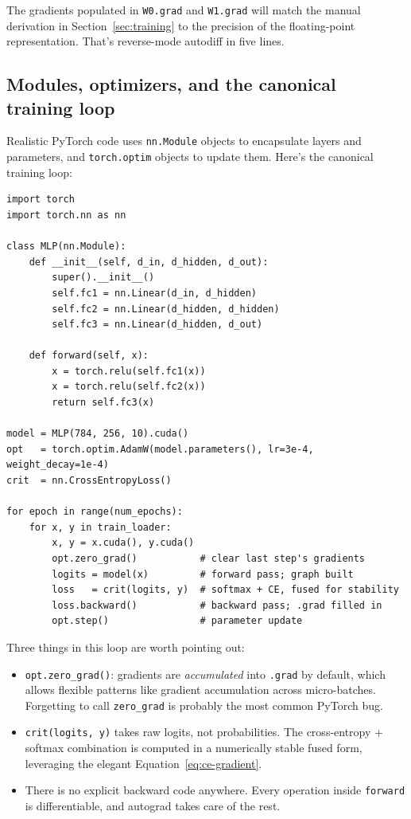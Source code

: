 \documentclass[11pt, a4paper]{article}
\begin{document}
The gradients populated in \verb|W0.grad| and \verb|W1.grad| will match the manual derivation in Section~\ref{sec:training} to the precision of the floating-point representation. That's reverse-mode autodiff in five lines.

\subsection{Modules, optimizers, and the canonical training loop}

Realistic PyTorch code uses \verb|nn.Module| objects to encapsulate layers and parameters, and \verb|torch.optim| objects to update them. Here's the canonical training loop:

\begin{lstlisting}
import torch
import torch.nn as nn

class MLP(nn.Module):
    def __init__(self, d_in, d_hidden, d_out):
        super().__init__()
        self.fc1 = nn.Linear(d_in, d_hidden)
        self.fc2 = nn.Linear(d_hidden, d_hidden)
        self.fc3 = nn.Linear(d_hidden, d_out)

    def forward(self, x):
        x = torch.relu(self.fc1(x))
        x = torch.relu(self.fc2(x))
        return self.fc3(x)

model = MLP(784, 256, 10).cuda()
opt   = torch.optim.AdamW(model.parameters(), lr=3e-4, weight_decay=1e-4)
crit  = nn.CrossEntropyLoss()

for epoch in range(num_epochs):
    for x, y in train_loader:
        x, y = x.cuda(), y.cuda()
        opt.zero_grad()           # clear last step's gradients
        logits = model(x)         # forward pass; graph built
        loss   = crit(logits, y)  # softmax + CE, fused for stability
        loss.backward()           # backward pass; .grad filled in
        opt.step()                # parameter update
\end{lstlisting}

Three things in this loop are worth pointing out:

\begin{itemize}[leftmargin=*]
    \item \verb|opt.zero_grad()|: gradients are \emph{accumulated} into \verb|.grad| by default, which allows flexible patterns like gradient accumulation across micro-batches. Forgetting to call \verb|zero_grad| is probably the most common PyTorch bug.
    \item \verb|crit(logits, y)| takes raw logits, not probabilities. The cross-entropy + softmax combination is computed in a numerically stable fused form, leveraging the elegant Equation~\eqref{eq:ce-gradient}.
    \item There is no explicit backward code anywhere. Every operation inside \verb|forward| is differentiable, and autograd takes care of the rest.
\end{itemize}
\end{document}
